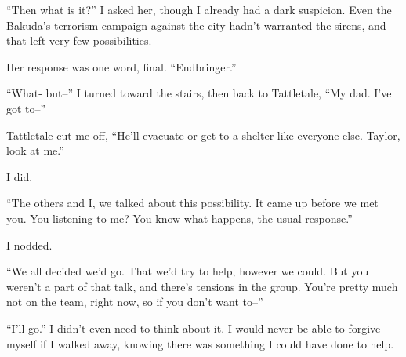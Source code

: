 ``Then what is it?''  I asked her, though I already had a dark suspicion.  Even the Bakuda's terrorism campaign against the city hadn't warranted the sirens, and that left very few possibilities.



Her response was one word, final. ``Endbringer.''



``What- but--''  I turned toward the stairs, then back to Tattletale, ``My dad.  I've got to--''



Tattletale cut me off, ``He'll evacuate or get to a shelter like everyone else.  Taylor, look at me.''



I did.



``The others and I, we talked about this possibility.  It came up before we met you.  You listening to me?  You know what happens, the usual response.''



I nodded.



``We all decided we'd go.  That we'd try to help, however we could.  But you weren't a part of that talk, and there's tensions in the group.  You're pretty much not on the team, right now, so if you don't want to--''



``I'll go.''  I didn't even need to think about it.  I would never be able to forgive myself if I walked away, knowing there was something I could have done to help.





